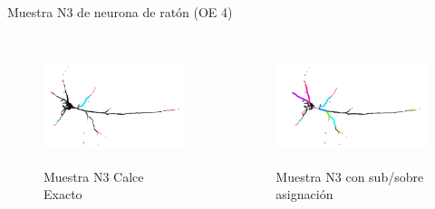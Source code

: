 \begin{frame}{Muestra N3 de neurona de rat\'on (OE 4)}
    \vspace{-0.2cm}
        \begin{columns}
        \begin{column}{0.45\textwidth}
            \begin{figure}
                \centering
                \includegraphics[height=1.35in]{Pictures/Porta18-3a1-phil-s10-v056-exactMatch-antLabeled.png}
                \caption{Muestra N3 Calce Exacto}
            \end{figure}
        \end{column}
        \begin{column}{0.45\textwidth}
            \begin{figure}
                \centering
                \includegraphics[height=1.35in]{Pictures/Porta18-3a1-phil-s10-v056-overmatches-3-antLabeled.png}
                \caption{Muestra N3 con sub/sobre asignaci\'on}
            \end{figure}
        \end{column}
    \end{columns}
    
    \begin{table}[h]
        \caption{(*) indica el mejor resultado de las 10 iteraciones}
    \end{table}
\end{frame}

